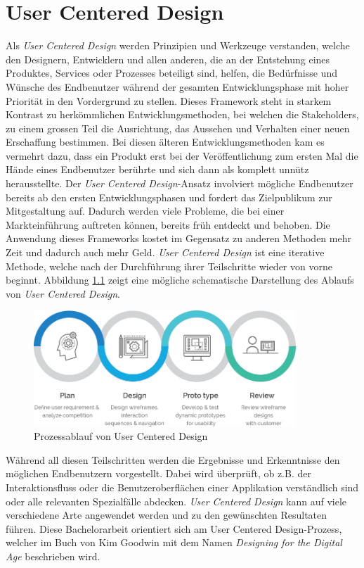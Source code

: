 \chapter{User Centered Design}
\label{sec:usercentric}
Als \textit{User Centered Design} werden Prinzipien und Werkzeuge verstanden, welche den Designern, Entwicklern und allen anderen, die an der Entstehung eines Produktes, Services oder Prozesses beteiligt sind, helfen, die Bedürfnisse und Wünsche des Endbenutzer während der gesamten Entwicklungsphase mit hoher Priorität in den Vordergrund zu stellen. Dieses Framework steht in starkem Kontrast zu herkömmlichen Entwicklungsmethoden, bei welchen die Stakeholders, zu einem grossen Teil die Ausrichtung, das Aussehen und Verhalten einer neuen Erschaffung bestimmen. Bei diesen älteren Entwicklungsmethoden kam es vermehrt dazu, dass ein Produkt erst bei der Veröffentlichung zum ersten Mal die Hände eines Endbenutzer berührte und sich dann als komplett unnütz herausstellte. Der \textit{User Centered Design}-Ansatz involviert mögliche Endbenutzer bereits ab den ersten Entwicklungsphasen und fordert das Zielpublikum zur Mitgestaltung auf. Dadurch werden viele Probleme, die bei einer Markteinführung auftreten können, bereits früh entdeckt und behoben. Die Anwendung dieses Frameworks kostet im Gegensatz zu anderen Methoden mehr Zeit und dadurch auch mehr Geld. \textit{User Centered Design} ist eine iterative Methode, welche nach der Durchführung ihrer Teilschritte wieder von vorne beginnt. Abbildung \ref{fig:usercentereddesign} zeigt eine mögliche schematische Darstellung des Ablaufs von \textit{User Centered Design}.

\begin{figure}[ht]
	\centering
  \includegraphics[width=0.88\textwidth]{images/userCenteredDesign.png}
	\caption{Prozessablauf von User Centered Design}
	\label{fig:usercentereddesign}
\end{figure}

Während all diesen Teilschritten werden die Ergebnisse und Erkenntnisse den möglichen Endbenutzern vorgestellt. Dabei wird überprüft, ob z.B. der Interaktionsfluss oder die Benutzeroberflächen einer Applikation verständlich sind oder alle relevanten Spezialfälle abdecken. \textit{User Centered Design} kann auf viele verschiedene Arte angewendet werden und zu den gewünschten Resultaten führen. Diese Bachelorarbeit orientiert sich am User Centered Design-Prozess, welcher im Buch von Kim Goodwin mit dem Namen \textit{Designing for the Digital Age} \citep{goodwin2011designing} beschrieben wird.


